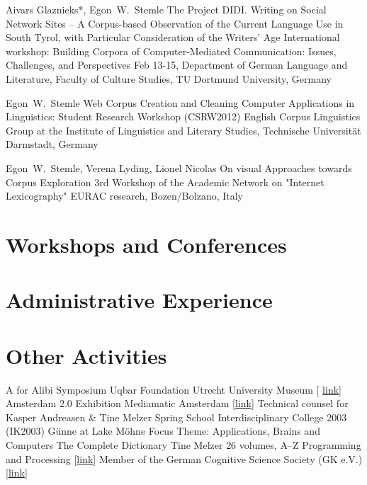 \documentclass[10pt,a4paper,sans]{moderncv}
\begin{document}
        {Aivars Glaznieks*, Egon~W.~Stemle}
        {The Project DIDI. Writing on Social Network Sites -- A
        Corpus-based Observation of the Current Language Use in South Tyrol,
        with Particular Consideration of the Writers’ Age} 
        {International workshop: Building Corpora of Computer-Mediated
        Communication: Issues, Challenges, and Perspectives}
        {Feb 13-15, Department of German Language and Literature, Faculty of
        Culture Studies, TU Dortmund University, Germany}
        {}

        {Egon~W.~Stemle}
        {Web Corpus Creation and Cleaning}
        {Computer Applications in Linguistics: Student Research Workshop (CSRW2012)}
        {English Corpus Linguistics Group at the Institute of
        Linguistics and Literary Studies, Technische Universit\"{a}t Darmstadt, Germany}
        {}

        {Egon~W.~Stemle, Verena Lyding, Lionel Nicolas}
        {On visual Approaches towards Corpus Exploration}
        {3rd Workshop of the Academic Network on "Internet Lexicography"}
        {EURAC research, Bozen/Bolzano, Italy}
        {}

\section{Workshops and Conferences}


\section{Administrative Experience}


\section{Other Activities}
        {A for Alibi Symposium}
        {}
        {Uqbar Foundation}
        {Utrecht University Museum [%
        \href{http://www.sternbergpress.com/?pageId=1204}{link}]}
        {}	
        {Amsterdam 2.0 Exhibition}
        {}
        {Mediamatic}
        {Amsterdam [\href{http://www.mediamatic.net/artefact-9850-en.html}%
        {link}]}
        {Technical counsel for Kasper Andreasen \& Tine Melzer}
        {Spring School}
        {}
        {Interdisciplinary College 2003 (IK2003)}
        {G\"{u}nne at Lake M\"{o}hne}
        {Focus Theme: Applications, Brains and Computers}
        {The Complete Dictionary}
        {}
        {Tine Melzer}
        {26 volumes, A--Z}
        {Programming and Processing
        [\href{http://www.tinemelzer.eu/works/the-complete-dictionary/}
        {link}]}
        {Member of the German Cognitive Science Society (GK e.V.)}
        {}
        {}
        {[\href{http://www.gk-ev.de}{link}]}
        {}
\end{document}
